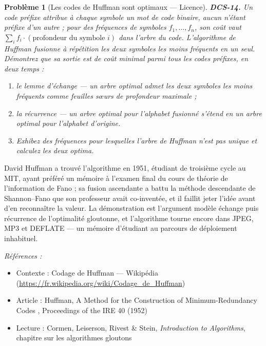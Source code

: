 \documentclass[11pt]{article}
\newtheorem{problem}{Problème}
\newenvironment{refs}{\par\small\noindent\emph{Références :}\begin{itemize}\setlength\itemsep{0pt}}{\end{itemize}\normalsize}
\begin{document}
\bigskip

\begin{problem}[{Les codes de Huffman sont optimaux --- Licence}]
\textbf{DCS-14.} Un code préfixe attribue à chaque symbole un mot de code binaire, aucun n'étant préfixe d'un autre ; pour des fréquences de symboles $f_1, \dots, f_n$, son coût vaut $\sum_i f_i \cdot (\text{profondeur du symbole } i)$ dans l'arbre du code. L'algorithme de Huffman fusionne à répétition les deux symboles les moins fréquents en un seul. Démontrez que sa sortie est de coût minimal parmi tous les codes préfixes, en deux temps :
\begin{enumerate}
\item[(a)] le lemme d'échange --- un arbre optimal admet les deux symboles les moins fréquents comme feuilles s\oe{}urs de profondeur maximale ;
\item[(b)] la récurrence --- un arbre optimal pour l'alphabet fusionné s'étend en un arbre optimal pour l'alphabet d'origine.
\item[(c)] Exhibez des fréquences pour lesquelles l'arbre de Huffman n'est pas unique et calculez les deux optima.
\end{enumerate}

\end{problem}

\noindent David Huffman a trouvé l'algorithme en 1951, étudiant de troisième cycle au MIT, ayant préféré un mémoire à l'examen final du cours de théorie de l'information de Fano ; sa fusion ascendante a battu la méthode descendante de Shannon--Fano que son professeur avait co-inventée, et il faillit jeter l'idée avant d'en reconnaître la valeur. La démonstration est l'argument modèle \og{} échange puis récurrence \fg{} de l'optimalité gloutonne, et l'algorithme tourne encore dans JPEG, MP3 et DEFLATE --- un mémoire d'étudiant au parcours de déploiement inhabituel.

\begin{refs}
\item Contexte : Codage de Huffman --- Wikipédia (\url{https://fr.wikipedia.org/wiki/Codage_de_Huffman})
\item Article : Huffman, \og{} A Method for the Construction of Minimum-Redundancy Codes \fg{}, Proceedings of the IRE 40 (1952)
\item Lecture : Cormen, Leiserson, Rivest \& Stein, \textit{Introduction to Algorithms}, chapitre sur les algorithmes gloutons
\end{refs}

\bigskip
\end{document}
